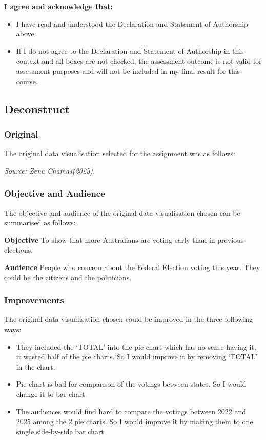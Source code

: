\documentclass[
]{article}
\providecommand{\tightlist}{%
  \setlength{\itemsep}{0pt}\setlength{\parskip}{0pt}}
\begin{document}
\textbf{I agree and acknowledge that:}

\begin{itemize}
\item
  I have read and understood the Declaration and Statement of Authorship
  above.
\item
  If I do not agree to the Declaration and Statement of Authorship in
  this context and all boxes are not checked, the assessment outcome is
  not valid for assessment purposes and will not be included in my final
  result for this course.
\end{itemize}

\subsection{Deconstruct}\label{deconstruct}

\subsubsection{Original}\label{original}

The original data visualisation selected for the assignment was as
follows:

\emph{Source: Zena Chamas(2025).}

\subsubsection{Objective and Audience}\label{objective-and-audience}

The objective and audience of the original data visualisation chosen can
be summarised as follows:

\textbf{Objective} To show that more Australians are voting early than
in previous elections.

\textbf{Audience} People who concern about the Federal Election voting
this year. They could be the citizens and the politicians.

\subsubsection{Improvements}\label{improvements}

The original data visualisation chosen could be improved in the three
following ways:

\begin{itemize}
\tightlist
\item
  They included the `TOTAL' into the pie chart which has no sense having
  it, it wasted half of the pie charts. So I would improve it by
  removing `TOTAL' in the chart.
\item
  Pie chart is bad for comparison of the votings between states. So I
  would change it to bar chart.
\item
  The audiences would find hard to compare the votings between 2022 and
  2025 among the 2 pie charts. So I would improve it by making them to
  one single side-by-side bar chart
\end{itemize}
\end{document}
